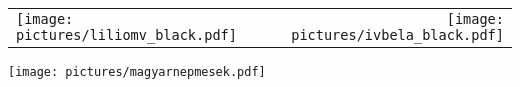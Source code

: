 \begin{titlepage}
\begin{center}

    \begin{table}[ht]
        \begin{tabular*}{\textwidth}{@{\extracolsep{\fill}}lcr}
        \texttt{[image: pictures/liliomv\_black.pdf]} &  & \texttt{[image: pictures/ivbela\_black.pdf]}\\
        \end{tabular*}
    \end{table}%





{\large \cscslong}


\texttt{[image: pictures/magyarnepmesek.pdf]}



\vfill

\end{center}

\begin{center}


{\large \textsc{\kiado}}

\end{center}
 
\end{titlepage}
